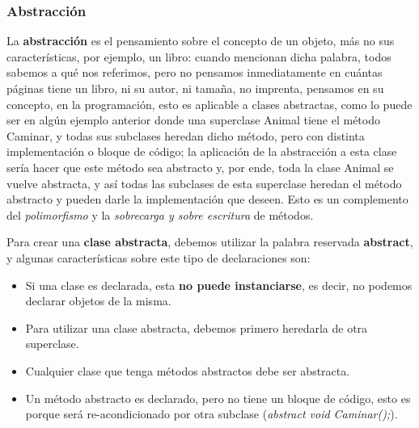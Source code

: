 \subsubsection{Abstracción}
\hspace{0.55cm}La \textbf{abstracción} es el pensamiento sobre el concepto de un objeto, más no sus características, por ejemplo, un libro: cuando mencionan dicha palabra, todos sabemos a qué nos referimos, pero no pensamos inmediatamente en cuántas páginas tiene un libro, ni su autor, ni tamaña, no imprenta, pensamos en su concepto, en la programación, esto es aplicable a clases abstractas, como lo puede ser en algún ejemplo anterior donde una superclase Animal tiene el método Caminar, y todas sus subclases heredan dicho método, pero con distinta implementación o bloque de código; la aplicación de la abstracción a esta clase sería hacer que este método sea abstracto y, por ende, toda la clase Animal se vuelve abstracta, y así todas las subclases de esta superclase heredan el método abstracto y pueden darle la implementación que deseen. Esto es un complemento del \textit{polimorfismo} y la \textit{sobrecarga y sobre escritura} de métodos.

Para crear una \textbf{clase abstracta}, debemos utilizar la palabra reservada \textbf{abstract}, y algunas características sobre este tipo de declaraciones son:
\begin{itemize}
    \item Si una clase es declarada, esta \textbf{no puede instanciarse}, es decir, no podemos declarar objetos de la misma.
    \item Para utilizar una clase abstracta, debemos primero heredarla de otra superclase.
    \item Cualquier clase que tenga métodos abstractos debe ser abstracta.
    \item Un método abstracto es declarado, pero no tiene un bloque de código, esto es porque será re-acondicionado por otra subclase (\textit{abstract void Caminar();}).
\end{itemize}


